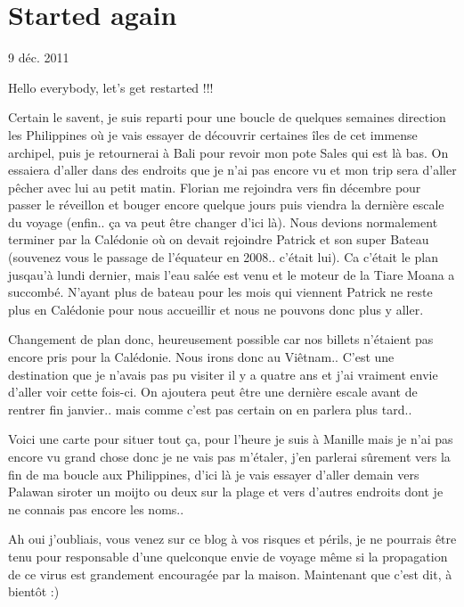 \section{Started again}

9 déc. 2011

\begin{multicols}{2}

Hello everybody, let's get restarted !!!

Certain le savent, je suis reparti pour une boucle de quelques semaines direction les Philippines où je vais essayer de découvrir certaines îles de cet immense archipel, puis je retournerai à Bali pour revoir mon pote Sales qui est là bas. On essaiera d'aller dans des endroits que je n'ai pas encore vu et mon trip sera d'aller pêcher avec lui au petit matin. Florian me rejoindra vers fin décembre pour passer le réveillon et bouger encore quelque jours puis viendra la dernière escale du voyage (enfin.. ça va peut être changer d'ici là). Nous devions normalement terminer par la Calédonie où on devait rejoindre Patrick et son super Bateau (souvenez vous le passage de l'équateur en 2008.. c'était lui). Ca c'était le plan jusqau'à lundi dernier, mais l'eau salée est venu et le moteur de la Tiare Moana a succombé. N'ayant plus de bateau pour les mois qui viennent Patrick ne reste plus en Calédonie pour nous accueillir et nous ne pouvons donc plus y aller.

Changement de plan donc, heureusement possible car nos billets n'étaient pas encore pris pour la Calédonie. Nous irons donc au Viêtnam.. C'est une destination que je n'avais pas pu visiter il y a quatre ans et j'ai vraiment envie d'aller voir cette fois-ci. On ajoutera peut être une dernière escale avant de rentrer fin janvier.. mais comme c'est pas certain on en parlera plus tard..

Voici une carte pour situer tout ça, pour l'heure je suis à Manille mais je n'ai pas encore vu grand chose donc je ne vais pas m'étaler, j'en parlerai sûrement vers la fin de ma boucle aux Philippines, d'ici là je vais essayer d'aller demain vers Palawan siroter un moijto ou deux sur la plage et vers d'autres endroits dont je ne connais pas encore les noms..


Ah oui j'oubliais, vous venez sur ce blog à vos risques et périls, je ne pourrais être tenu pour responsable d'une quelconque envie de voyage même si la propagation de ce virus est grandement encouragée par la maison. Maintenant que c'est dit, à bientôt :)

\end{multicols}


